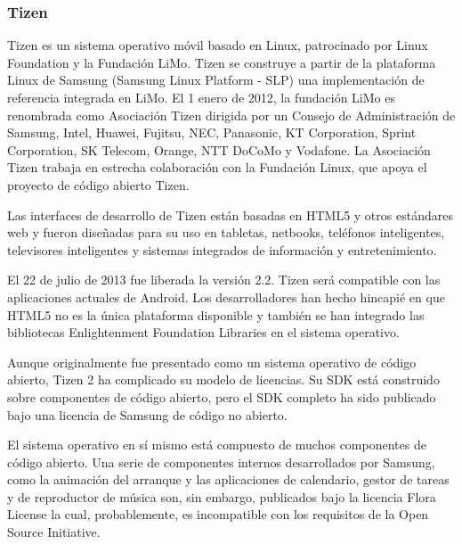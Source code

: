 \subsubsection{Tizen}
Tizen es un sistema operativo móvil basado en Linux, patrocinado por Linux Foundation y la Fundación LiMo. Tizen se construye a partir de la plataforma Linux de Samsung (Samsung Linux Platform - SLP) una implementación de referencia integrada en LiMo. El 1 enero de 2012, la fundación LiMo es renombrada como Asociación Tizen dirigida por un Consejo de Administración de Samsung, Intel, Huawei, Fujitsu, NEC, Panasonic, KT Corporation, Sprint Corporation, SK Telecom, Orange, NTT DoCoMo y Vodafone. La Asociación Tizen trabaja en estrecha colaboración con la Fundación Linux, que apoya el proyecto de código abierto Tizen.

Las interfaces de desarrollo de Tizen están basadas en HTML5 y otros estándares web y fueron diseñadas para su uso en tabletas, netbooks, teléfonos inteligentes, televisores inteligentes y sistemas integrados de información y entretenimiento.

El 22 de julio de 2013 fue liberada la versión 2.2. Tizen será compatible con las aplicaciones actuales de Android. Los desarrolladores han hecho hincapié en que HTML5 no es la única plataforma disponible y también se han integrado las bibliotecas Enlightenment Foundation Libraries en el sistema operativo.

Aunque originalmente fue presentado como un sistema operativo de código abierto, Tizen 2 ha complicado su modelo de licencias. Su SDK está construido sobre componentes de código abierto, pero el SDK completo ha sido publicado bajo una licencia de Samsung de código no abierto.

El sistema operativo en sí mismo está compuesto de muchos componentes de código abierto. Una serie de componentes internos desarrollados por Samsung, como la animación del arranque y las aplicaciones de calendario, gestor de tareas y de reproductor de música son, sin embargo, publicados bajo la licencia Flora License la cual, probablemente, es incompatible con los requisitos de la Open Source Initiative.

